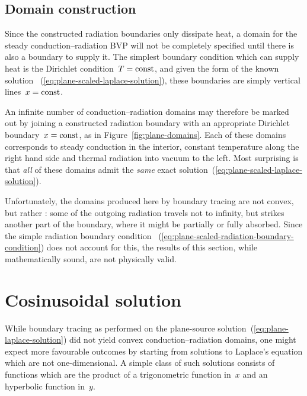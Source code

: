 \begin{figure}
\end{figure}

\subsection{Domain construction}
\label{sec:cartesian.plane.domain}

Since the constructed radiation boundaries only dissipate heat,
a domain for the steady conduction--radiation BVP
will not be completely specified
until there is also a boundary to supply it.
The simplest boundary condition which can supply heat
is the Dirichlet condition~$T = \mathrm{const}$,
and given the form of the known solution~%
  (\ref{eq:plane-scaled-laplace-solution}),
these boundaries are simply vertical lines~$x = \mathrm{const}$.

An infinite number of conduction--radiation domains
may therefore be marked out
by joining a constructed radiation boundary
with an appropriate Dirichlet boundary~$x = \mathrm{const}$,
as in Figure~\ref{fig:plane-domains}.
Each of these domains corresponds to steady conduction in the interior,
constant temperature along the right hand side
and thermal radiation into vacuum to the left.
Most surprising is that \emph{all} of these domains
admit the \emph{same} exact solution~(\ref{eq:plane-scaled-laplace-solution}).

Unfortunately,
the domains produced here by boundary tracing are not convex,
but rather :
some of the outgoing radiation travels not to infinity,
but strikes another part of the boundary,
where it might be partially or fully absorbed.
Since the simple radiation boundary condition~%
  (\ref{eq:plane-scaled-radiation-boundary-condition})
does not account for this,
the results of this section,
while mathematically sound,
are not physically valid.

\section{Cosinusoidal solution}
\label{sec:cartesian.cosine}

While boundary tracing as performed on
the plane-source solution~(\ref{eq:plane-laplace-solution})
did not yield convex conduction--radiation domains,
one might expect more favourable outcomes
by starting from solutions to Laplace's equation
which are not one-dimensional.
A simple class of such solutions consists of functions which are the product
of a trigonometric function in~$x$ and an hyperbolic function in~$y$.

